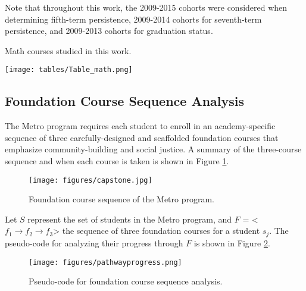 \documentclass[conference]{IEEEtran}
\begin{document}
Note that throughout this work, the 2009-2015 cohorts were considered when determining fifth-term persistence, 2009-2014 cohorts for seventh-term persistence, and 2009-2013 cohorts for graduation status.

\begin{table}[tbp]
\caption{Math courses studied in this work.}
\texttt{[image: tables/Table\_math.png]}
\label{table:math}
\end{table}

\subsection{Foundation Course Sequence Analysis}

The Metro program requires each student to enroll in an academy-specific sequence of three carefully-designed and scaffolded foundation courses that emphasize community-building and social justice.  A summary of the three-course sequence and when each course is taken is shown in Figure \ref{capstone}.  %

\begin{figure}[htbp]
\texttt{[image: figures/capstone.jpg]}
\caption{Foundation course sequence of the Metro program.}
\label{capstone}
\end{figure}

Let $S$ represent the set of students in the Metro program, and $F$ = \textless $f_1 \rightarrow f_2 \rightarrow f_3$\textgreater{} the sequence of three foundation courses for a student $s_j$.  The pseudo-code for analyzing their progress through $F$ is shown in Figure \ref{pseudo_foundation}.     

\begin{figure}[htbp]
\centering
\texttt{[image: figures/pathwayprogress.png]}
\caption{Pseudo-code for foundation course sequence analysis.}
\label{pseudo_foundation}
\end{figure}
\end{document}
